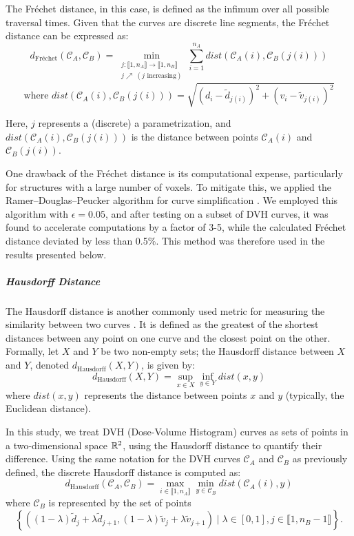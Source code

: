 The Fréchet distance, in this case, is defined as the infimum over all possible traversal times.
Given that the curves are discrete line segments, the Fréchet distance can be expressed as:
$$d_{\text{Fréchet}}(\mathcal{C}_A, \mathcal{C}_B) = \min_{\substack{j: \llbracket 1, n_A \rrbracket \to \llbracket 1, n_B \rrbracket \\ j \nearrow \ (j \text{ increasing})}} \sum_{i=1}^{n_A} dist\left( \mathcal{C}_A(i), \mathcal{C}_B(j(i)) \right)$$
$$\text{where } dist\left( \mathcal{C}_A(i), \mathcal{C}_B(j(i)) \right) = \sqrt{(d_i-\tilde{d}_{j(i)})^2 + (v_i-\tilde{v}_{j(i)})^2}$$

Here, $j$ represents a (discrete) a parametrization, and $dist\left( \mathcal{C}_A(i), \mathcal{C}_B(j(i)) \right)$ is the distance between points $\mathcal{C}_A(i)$ and $\mathcal{C}_B(j(i))$.

One drawback of the Fréchet distance is its computational expense, particularly for structures with a large number of voxels.
To mitigate this, we applied the Ramer–Douglas–Peucker algorithm for curve simplification \cite{PRASAD2012843}.
We employed this algorithm with $\epsilon=0.05$, and after testing on a subset of DVH curves, it was found to accelerate computations by a factor of 3-5, while the calculated Fréchet distance deviated by less than 0.5\%.
This method was therefore used in the results presented below.


\subparagraph{Hausdorff Distance}
The Hausdorff distance is another commonly used metric for measuring the similarity between two curves \cite{Henrikson1999CompletenessAT}.
It is defined as the greatest of the shortest distances between any point on one curve and the closest point on the other.
Formally, let $X$ and $Y$ be two non-empty sets;
the Hausdorff distance between $X$ and $Y$, denoted $d_\text{Hausdorff}(X, Y)$, is given by:
$$d_\text{Hausdorff}(X, Y) = \sup_{x \in X}\inf_{y \in Y} {dist(x, y)}$$
where $dist(x, y)$ represents the distance between points $x$ and $y$ (typically, the Euclidean distance).

In this study, we treat DVH (Dose-Volume Histogram) curves as sets of points in a two-dimensional space $\mathbb{R}^2$, using the Hausdorff distance to quantify their difference.
Using the same notation for the DVH curves $\mathcal{C}_A$ and $\mathcal{C}_B$ as previously defined, the discrete Hausdorff distance is computed as:
$$d_\text{Hausdorff}(\mathcal{C}_A, \mathcal{C}_B) = \max_{i \in \llbracket 1,n_A \rrbracket} \min_{y \in \mathcal{C}_B} {dist(\mathcal{C}_A(i), y)}$$
where $\mathcal{C}_B$ is represented by the set of points
$$\left\lbrace \left( (1-\lambda) \tilde{d}_j + \lambda \tilde{d}_{j+1}, (1-\lambda) \tilde{v}_j + \lambda \tilde{v}_{j+1} \right) \mid \lambda \in \left[ 0,1 \right], j \in \llbracket 1, n_B-1 \rrbracket \right\rbrace.$$

